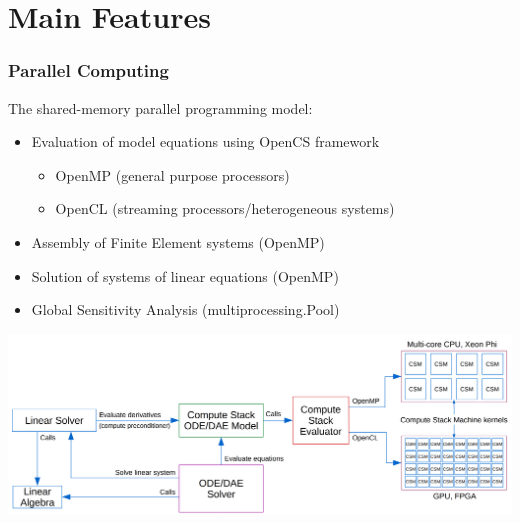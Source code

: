 \documentclass[compress,newPxFont,sthlmFooter]{beamer}
\begin{document}

\section{Main Features}

\begin{frame}[plain]
\frametitle{Parallel Computing}
    The \alert{shared-memory} parallel programming model:
    \begin{itemize}
      \item \alert{Evaluation of model equations} using \alert{OpenCS} framework
         \begin{itemize}
            \item \alert{OpenMP} (general purpose processors)
            \item \alert{OpenCL} (streaming processors/heterogeneous systems)
         \end{itemize}   
      \item \alert{Assembly of Finite Element systems} (OpenMP)
      \item \alert{Solution of systems of linear equations} (OpenMP)
      \item \alert{Global Sensitivity Analysis} (multiprocessing.Pool)
    \end{itemize}
    \begin{center}
        \includegraphics[align=c, height=0.37\paperheight]{Simulation-SharedMemorySystems.png}
    \end{center}
\end{frame}
\end{document}
